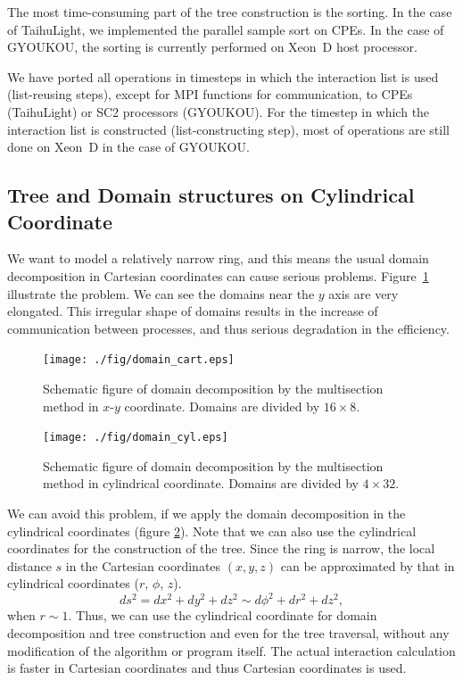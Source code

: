 \documentclass[conference]{IEEEtran}
\begin{document}
The most time-consuming part of the tree construction is the
sorting. In the case of TaihuLight, we implemented the parallel sample
sort\cite{cmsort} on CPEs. In the case of GYOUKOU, the sorting is currently
performed on Xeon~D host processor.

We have ported all operations in timesteps in which the interaction
list is used (list-reusing steps), except for MPI functions for
communication, to CPEs (TaihuLight) or SC2 processors (GYOUKOU). For
the timestep in which the interaction list is constructed
(list-constructing step), most of operations are still done on Xeon~D
in the case of GYOUKOU.

\subsection{Tree and Domain structures on Cylindrical Coordinate}
\label{subsec:cylcoord}

We want to model a relatively narrow ring, and this means the usual
domain decomposition in Cartesian coordinates can cause serious
problems. Figure~\ref{fig:domain_cart} illustrate the problem. We
can see the domains near the $y$ axis are very elongated. This
irregular shape of domains results in the increase of communication
between processes, and thus serious degradation in the efficiency. 

\begin{figure}
  \centering \texttt{[image: ./fig/domain\_cart.eps]}
  \caption{Schematic figure of domain decomposition by the multisection
    method in $x$-$y$ coordinate. Domains are divided by $16 \times 8$.}
  \label{fig:domain_cart}
\end{figure}

\begin{figure}
  \centering
    \texttt{[image: ./fig/domain\_cyl.eps]}
  \caption{Schematic figure of domain decomposition by the multisection
    method in cylindrical coordinate. Domains are divided by $4 \times 32$.}
  \label{fig:domain_cyl}
\end{figure}

We can avoid this problem, if we apply the domain decomposition 
in the  cylindrical coordinates (figure  \ref{fig:domain_cyl}).
Note that we can also use the  cylindrical coordinates for the
construction of the tree.  Since
the ring is narrow, the local distance $s$ in the Cartesian coordinates
$(x, y, z)$ can be approximated by that in cylindrical coordinates
($r$, $\phi$, $z$).
\begin{equation}
  \label{eq:metric}
  ds^2 = dx^2 + dy^2 + dz^2 \sim d\phi ^2 + dr^2 + dz^2,
\end{equation}
when $r \sim 1$. Thus,
we can use the cylindrical coordinate
for domain decomposition and tree
construction and even for the tree traversal,  without any modification of the algorithm or program
itself. The actual interaction calculation is faster in Cartesian
coordinates and thus Cartesian coordinates is used.
\end{document}

